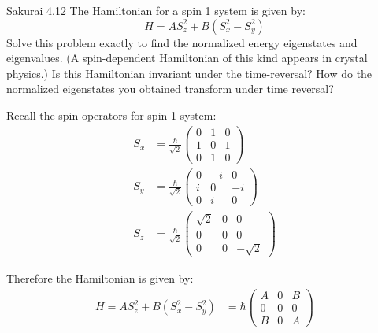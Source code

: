 \documentclass{article}
\begin{document}
\newpage
\begin{section}{Sakurai 4.12}
The Hamiltonian for a spin 1 system is given by:
$$
	H =  A S_z^2 + B (S_x^2 - S_y^2)
$$
Solve this problem exactly to find the normalized energy eigenstates and eigenvalues. (A spin-dependent Hamiltonian of this kind appears in crystal physics.) Is this Hamiltonian invariant under the time-reversal? How do the normalized eigenstates you obtained transform under time reversal?

\begin{tcolorbox}[breakable]
	Recall the spin operators for spin-1 system:
	\begin{align*}
		S_x & = \frac{\hbar}{\sqrt{2}} \begin{pmatrix} 0 & 1 & 0 \\ 1 & 0 & 1 \\ 0 & 1 & 0 \end{pmatrix}                \\
		S_y & = \frac{\hbar}{\sqrt{2}} \begin{pmatrix} 0 & -i & 0 \\ i & 0 & -i \\ 0 & i & 0 \end{pmatrix}              \\
		S_z & = \frac{\hbar}{\sqrt{2}} \begin{pmatrix} \sqrt{2} & 0 & 0 \\ 0 & 0 & 0 \\ 0 & 0 & -\sqrt{2} \end{pmatrix}
	\end{align*}

	Therefore the Hamiltonian is given by:
	\begin{align*}
		H = A S_z^2 + B (S_x^2 - S_y^2) & = \hbar \begin{pmatrix} A & 0 & B \\ 0 & 0 & 0 \\ B & 0 & A \end{pmatrix}
	\end{align*}


\end{tcolorbox}
\end{section}
\end{document}
